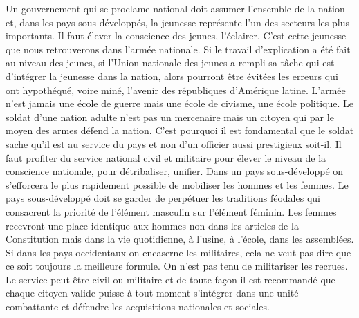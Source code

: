 \documentclass[french,twoside]{book} %
\begin{document}
Un gouvernement qui se proclame national doit assumer l’ensemble de la nation et, dans les pays sous-développés, la jeunesse représente l’un des secteurs les plus importants. Il faut élever la conscience des jeunes, l’éclairer. C’est cette jeunesse que nous retrouverons dans l’armée nationale. Si le travail d’explication a été fait au niveau des jeunes, si l’Union nationale des jeunes a rempli sa tâche qui est d’intégrer la jeunesse dans la nation, alors pourront être évitées les erreurs qui ont hypothéqué, voire miné, l’avenir des républiques d’Amérique latine. L’armée n’est jamais une école de guerre mais une école de   civisme, une école politique. Le soldat d’une nation adulte n’est pas un mercenaire mais un citoyen qui par le moyen des armes défend la nation. C’est pourquoi il est fondamental que le soldat sache qu’il est au service du pays et non d’un officier aussi prestigieux soit-il. Il faut profiter du service national civil et militaire pour élever le niveau de la conscience nationale, pour détribaliser, unifier. Dans un pays sous-développé on s’efforcera le plus rapidement possible de mobiliser les hommes et les femmes. Le pays sous-développé doit se garder de perpétuer les traditions féodales qui consacrent la priorité de l’élément masculin sur l’élément féminin. Les femmes recevront une place identique aux hommes non dans les articles de la Constitution mais dans la vie quotidienne, à l’usine, à l’école, dans les assemblées. Si dans les pays occidentaux on encaserne les militaires, cela ne veut pas dire que ce soit toujours la meilleure formule. On n’est pas tenu de militariser les recrues. Le service peut être civil ou militaire et de toute façon il est recommandé que chaque citoyen valide puisse à tout moment s’intégrer dans une unité combattante et défendre les acquisitions nationales et sociales.\par
\bigbreak
\end{document}

